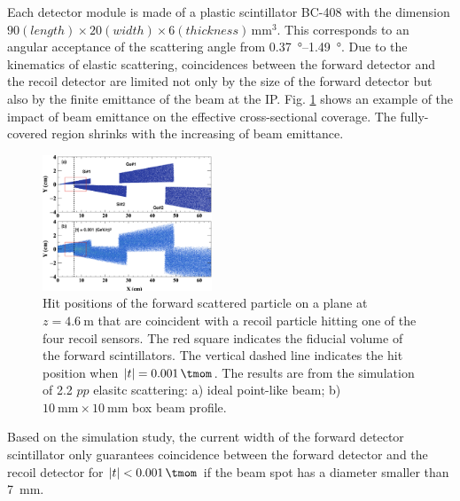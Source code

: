 \documentclass[number,5p]{elsarticle}
\begin{document}
Each detector module is made of a plastic scintillator BC-408 \cite{bc408} with the dimension $90 (length) \times 20 (width) \times 6
(thickness)\,\si{\mm\tothe{3}}$.
This corresponds to an angular acceptance of the scattering angle from \SIrange[range-units=repeat]{0.37}{1.49}{\degree}.
Due to the kinematics of elastic scattering, coincidences between the forward
detector and the recoil detector are limited not only by the size of the forward
detector but also by the finite emittance of the beam at the IP.
Fig. \ref{fig:forward_acceptance} shows an example of the impact of beam emittance on the
effective cross-sectional coverage.
The fully-covered region shrinks with the increasing of beam emittance. 
\begin{figure}[htb]
  \centering
  \includegraphics[width=0.45\textwidth]{./fwd_acceptance.png}
  \caption{
    Hit positions of the forward scattered particle on a plane at
    $z=\SI{4.6}{\m}$ that are coincident with a recoil particle hitting one of
    the four recoil sensors.
    The red square indicates the fiducial volume of the forward scintillators.
    The vertical dashed line indicates the hit position when $|t| = \SI{0.001}{\tmom}$.
    The results are from the simulation of \SI{2.2}{\momentum}
    $pp$ elasitc scattering: a) ideal point-like beam; b) $\SI{10}{\mm}\times\SI{10}{\mm}$ box beam profile.
    }
  \label{fig:forward_acceptance}
\end{figure}
Based on the simulation study, the current width of the forward detector
scintillator only guarantees coincidence between the forward detector and the
recoil detector for $|t| < \SI{0.001}{\tmom}$ if the beam spot has a diameter smaller than \SI{7}{\mm}.
\end{document}

